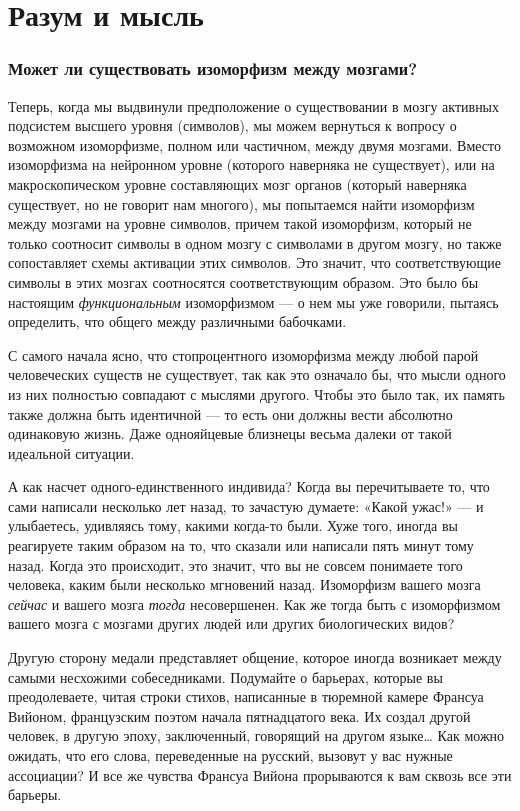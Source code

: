 \documentclass[../main.tex]{subfiles}
\begin{document}
\chapter{Разум и мысль}

\subsection{Может ли существовать изоморфизм между мозгами?}

Теперь, когда мы выдвинули предположение о существовании в мозгу активных подсистем высшего уровня (символов), мы можем вернуться к вопросу о возможном изоморфизме, полном или частичном, между двумя мозгами. Вместо изоморфизма на нейронном уровне (которого наверняка не существует), или на макроскопическом уровне составляющих мозг органов (который наверняка существует, но не говорит нам многого), мы попытаемся найти изоморфизм между мозгами на уровне символов, причем такой изоморфизм, который не только соотносит символы в одном мозгу с символами в другом мозгу, но также сопоставляет схемы активации этих символов. Это значит, что соответствующие символы в этих мозгах соотносятся соответствующим образом. Это было бы настоящим \emph{функциональным} изоморфизмом --- о нем мы уже говорили, пытаясь определить, что общего между различными бабочками.

С самого начала ясно, что стопроцентного изоморфизма между любой парой человеческих существ не существует, так как это означало бы, что мысли одного из них полностью совпадают с мыслями другого. Чтобы это было так, их память также должна быть идентичной --- то есть они должны вести абсолютно одинаковую жизнь. Даже однояйцевые близнецы весьма далеки от такой идеальной ситуации.

А как насчет одного-единственного индивида? Когда вы перечитываете то, что сами написали несколько лет назад, то зачастую думаете: «Какой ужас!» --- и улыбаетесь, удивляясь тому, какими когда-то были. Хуже того, иногда вы реагируете таким образом на то, что сказали или написали пять минут тому назад. Когда это происходит, это значит, что вы не совсем понимаете того человека, каким были несколько мгновений назад. Изоморфизм вашего мозга \emph{сейчас} и вашего мозга \emph{тогда} несовершенен. Как же тогда быть с изоморфизмом вашего мозга с мозгами других людей или других биологических видов?

Другую сторону медали представляет общение, которое иногда возникает между самыми несхожими собеседниками. Подумайте о барьерах, которые вы преодолеваете, читая строки стихов, написанные в тюремной камере Франсуа Вийоном, французским поэтом начала пятнадцатого века. Их создал другой человек, в другую эпоху, заключенный, говорящий на другом языке\ldots{} Как можно ожидать, что его слова, переведенные на русский, вызовут у вас нужные ассоциации? И все же чувства Франсуа Вийона прорываются к вам сквозь все эти барьеры.
\end{document}
